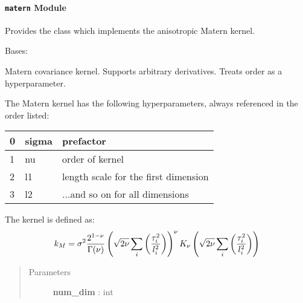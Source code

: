 \documentclass[letterpaper,10pt,english]{sphinxmanual}
\begin{document}
\paragraph{\texttt{matern} Module}
\label{gptools.kernel:matern-module}\label{gptools.kernel:module-gptools.kernel.matern}
Provides the {\hyperref[gptools.kernel:gptools.kernel.matern.MaternKernel]{}} class which implements the anisotropic Matern kernel.

\begin{fulllineitems}
\label{gptools.kernel:gptools.kernel.matern.MaternKernel}
Bases: {\hyperref[gptools.kernel:gptools.kernel.core.ChainRuleKernel]{}}

Matern covariance kernel. Supports arbitrary derivatives. Treats order as a hyperparameter.

The Matern kernel has the following hyperparameters, always referenced in
the order listed:

\begin{tabulary}{\linewidth}{|L|L|L|}
\hline

0
 & 
sigma
 & 
prefactor
\\\hline

1
 & 
nu
 & 
order of kernel
\\\hline

2
 & 
l1
 & 
length scale for the first dimension
\\\hline

3
 & 
l2
 & 
...and so on for all dimensions
\\\hline
\end{tabulary}


The kernel is defined as:
\begin{gather}
\begin{split}k_M = \sigma^2 \frac{2^{1-\nu}}{\Gamma(\nu)}
\left (\sqrt{2\nu} \sum_i\left (\frac{\tau_i^2}{l_i^2}\right )\right )^\nu
K_\nu\left(\sqrt{2\nu} \sum_i\left(\frac{\tau_i^2}{l_i^2}\right)\right)\end{split}\notag
\end{gather}\begin{quote}\begin{description}
\item[{Parameters }] \leavevmode
\textbf{num\_dim} : int
\begin{quote}


\end{quote}
\end{description}
\end{quote}
\end{fulllineitems}
\end{document}
